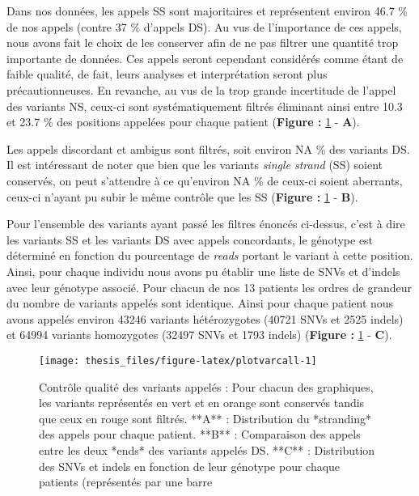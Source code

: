 \documentclass[12pt,twoside]{reedthesis}
\theoremstyle{definition}
\theoremstyle{definition}
\theoremstyle{remark}
\begin{document}
  Dans nos données, les appels SS sont majoritaires et représentent
  environ 46.7 \% de nos appels (contre 37 \% d'appels DS). Au vus de
  l'importance de ces appels, nous avons fait le choix de les conserver
  afin de ne pas filtrer une quantité trop importante de données. Ces
  appels seront cependant considérés comme étant de faible qualité, de
  fait, leurs analyses et interprétation seront plus précautionneuses. En
  revanche, au vus de la trop grande incertitude de l'appel des variants
  NS, ceux-ci sont systématiquement filtrés éliminant ainsi entre 10.3 et
  23.7 \% des positions appelées pour chaque patient (\textbf{Figure :
  }\ref{fig:plotvarcall} - \textbf{A}).
  
  Les appels discordant et ambigus sont filtrés, soit environ NA \% des
  variants DS. Il est intéressant de noter que bien que les variants
  \emph{single strand} (SS) soient conservés, on peut s'attendre à ce
  qu'environ NA \% de ceux-ci soient aberrants, ceux-ci n'ayant pu subir
  le même contrôle que les SS (\textbf{Figure : }\ref{fig:plotvarcall} -
  \textbf{B}).
  
  Pour l'ensemble des variants ayant passé les filtres énoncés ci-dessus,
  c'est à dire les variants SS et les variants DS avec appels concordants,
  le génotype est déterminé en fonction du pourcentage de \emph{reads}
  portant le variant à cette position. Ainsi, pour chaque individu nous
  avons pu établir une liste de SNVs et d'indels avec leur génotype
  associé. Pour chacun de nos 13 patients les ordres de grandeur du nombre
  de variants appelés sont identique. Ainsi pour chaque patient nous avons
  appelés environ 43246 variants hétérozygotes (40721 SNVs et 2525 indels)
  et 64994 variants homozygotes (32497 SNVs et 1793 indels)
  (\textbf{Figure : }\ref{fig:plotvarcall} - \textbf{C}).
  
  \newpage
  
  \begin{figure}
  
  {\centering \texttt{[image: thesis\_files/figure-latex/plotvarcall-1]} 
  
  }
  
  \caption[Contrôle qualité des variants appelés]{Contrôle qualité des variants appelés : Pour chacun des graphiques, les variants représentés en vert et en orange sont conservés tandis que ceux en rouge sont filtrés. **A** : Distribution du *stranding* des appels pour chaque patient. **B** : Comparaison des appels entre les deux *ends* des variants appelés DS. **C** : Distribution des SNVs et indels en fonction de leur génotype pour chaque patients (représentés par une barre}\label{fig:plotvarcall}
  \end{figure}
  
\end{document}
